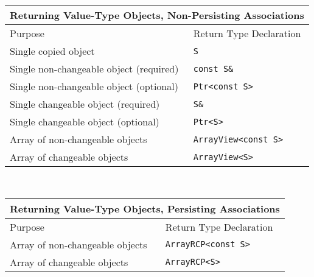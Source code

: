 \begin{tabular}{|l|l|}
%
\multicolumn{2}{c}{\textbf{Returning Value-Type Objects, Non-Persisting Associations}} \\
%
\hline
Purpose
& Return Type Declaration \\
\hline
\hline
Single copied object
& {}\texttt{S} \\
\hline
Single non-changeable object (required)
& {}\texttt{const S\&} \\
\hline
Single non-changeable object (optional)
& {}\texttt{Ptr<const S>} \\
\hline
Single changeable object (required)
& {}\texttt{S\&} \\
\hline
Single changeable object (optional)
& {}\texttt{Ptr<S>} \\
\hline
Array of non-changeable objects
& {}\texttt{ArrayView<const S>} \\
\hline
Array of changeable objects
& {}\texttt{ArrayView<S>} \\
\hline
%
\end{tabular} \\[3ex]
%
\begin{tabular}{|l|l|}
%
\multicolumn{2}{c}{\textbf{Returning Value-Type Objects, Persisting Associations}} \\
%
\hline
Purpose
& Return Type Declaration \\
\hline
\hline
Array of non-changeable objects
& {}\texttt{ArrayRCP<const S>} \\
\hline
Array of changeable objects
& {}\texttt{ArrayRCP<S>} \\
\hline
\end{tabular}
